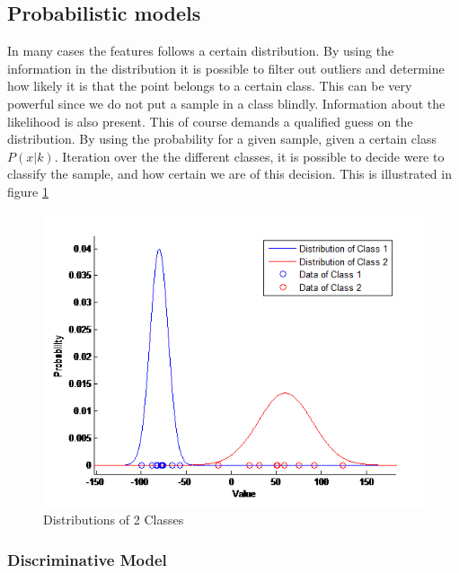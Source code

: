\subsection{Probabilistic models}
In many cases the features follows a certain distribution. By using the information in the distribution it is possible to filter out outliers and determine how likely it is that the point belongs to a certain class. This can be very powerful since we do not put a sample in a class blindly. Information about the likelihood is also present. This of course demands a qualified guess on the distribution. 
By using the probability for a given sample, given a certain class $P(x|k)$. Iteration over the the different classes, it is possible to decide were to classify the sample, and how certain we are of this decision. This is illustrated in figure \ref{fig:disex} 

\begin{figure}[H]
\centering
\includegraphics[scale=0.8]{billeder/DisEx}
\caption{Distributions of 2 Classes}
\label{fig:disex}
\end{figure}

\subsubsection{Discriminative Model}


